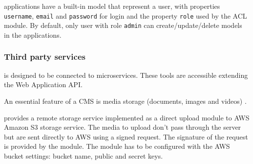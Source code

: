  applications have a built-in model that represent a user, with properties \texttt{username}, \texttt{email} and \texttt{password} for login and the property \texttt{role} used by the ACL module.
By default, only user with role \texttt{admin} can create/update/delete models in the applications.


\subsubsection{Third party services}
 is designed to be connected to microservices. These tools are accessible extending the Web Application API.

An essential feature of a CMS is media storage (documents, images and videos) \cite{5552271}. 

 provides a remote storage service implemented as a direct upload module to AWS Amazon S3 storage service. The media to upload don’t pass through the server but are sent directly to AWS using a signed request.
The signature of the request is provided by the module.
The module has to be configured with the AWS bucket settings: bucket name, public and secret keys. 

